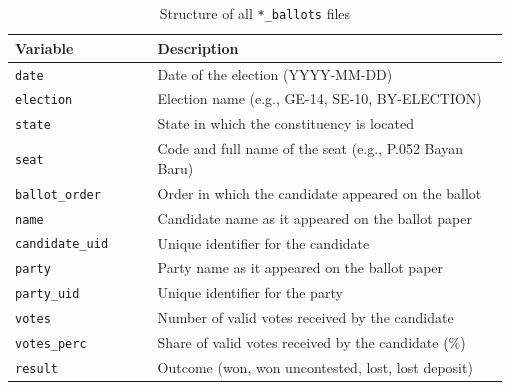\documentclass[11pt]{article}
\begin{document}
\begin{table}[ht]
	\def\arraystretch{1.3}
	\centering
	\caption{Structure of all \texttt{*\_ballots} files}
	\label{tab:ballots_structure}
	\vspace{0.14in}
	\begin{tabular}{L{0.29\linewidth}L{0.69\linewidth}}
	\toprule
	\textbf{Variable} & \textbf{Description} \\
	\midrule
	\texttt{date} & Date of the election (YYYY-MM-DD) \\
	\texttt{election} & Election name (e.g., GE-14, SE-10, BY-ELECTION) \\
	\texttt{state} & State in which the constituency is located \\
	\texttt{seat} & Code and full name of the seat (e.g., P.052 Bayan Baru) \\
	\texttt{ballot\_order} & Order in which the candidate appeared on the ballot \\
	\texttt{name} & Candidate name as it appeared on the ballot paper \\
	\texttt{candidate\_uid} & Unique identifier for the candidate \\
	\texttt{party} & Party name as it appeared on the ballot paper \\
	\texttt{party\_uid} & Unique identifier for the party \\
	\texttt{votes} & Number of valid votes received by the candidate \\
	\texttt{votes\_perc} & Share of valid votes received by the candidate (\%) \\
	\texttt{result} & Outcome (won, won uncontested, lost, lost deposit) \\
	\bottomrule
	\end{tabular}
\end{table}
\end{document}
